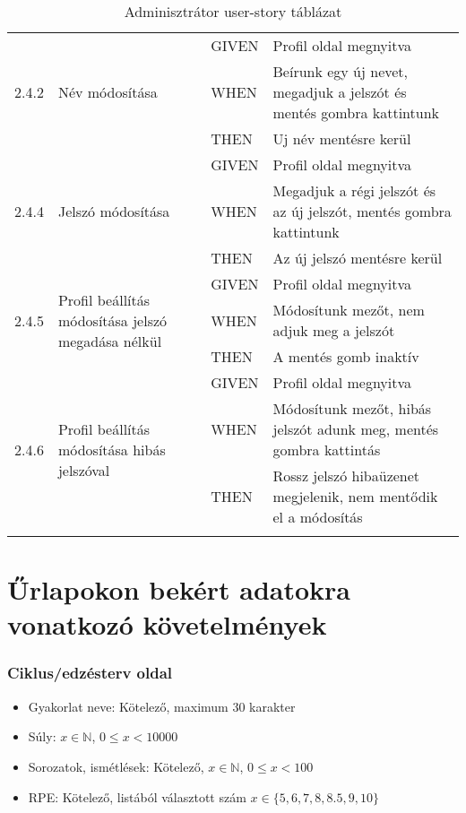 \begin{center}
\begin{longtable}{ | p{} | p{} | p{} | p{} | }
			\multirow{3}{*}{2.4.2} 
			& \multirow{3}{=}{Név módosítása} 
			& GIVEN 
			& Profil oldal megnyitva \\
			\cline{3-4}
			& & WHEN 
			& Beírunk egy új nevet, megadjuk a jelszót és mentés gombra kattintunk \\
			\cline{3-4}
			& & THEN 
			& Uj név mentésre kerül \\
			\hline

			\multirow{3}{*}{2.4.4} 
			& \multirow{3}{=}{Jelszó módosítása} 
			& GIVEN 
			& Profil oldal megnyitva \\
			\cline{3-4}
			& & WHEN 
			& Megadjuk a régi jelszót és az új jelszót, mentés gombra kattintunk \\
			\cline{3-4}
			& & THEN 
			& Az új jelszó mentésre kerül \\
			\hline

			\multirow{3}{*}{2.4.5} 
			& \multirow{3}{=}{Profil beállítás módosítása jelszó megadása nélkül} 
			& GIVEN 
			& Profil oldal megnyitva \\
			\cline{3-4}
			& & WHEN 
			& Módosítunk mezőt, nem adjuk meg a jelszót \\
			\cline{3-4}
			& & THEN 
			& A mentés gomb inaktív \\
			\hline

			\multirow{3}{*}{2.4.6} 
			& \multirow{3}{=}{Profil beállítás módosítása hibás jelszóval} 
			& GIVEN 
			& Profil oldal megnyitva \\
			\cline{3-4}
			& & WHEN 
			& Módosítunk mezőt, hibás jelszót adunk meg, mentés gombra kattintás \\
			\cline{3-4}
			& & THEN 
			& Rossz jelszó hibaüzenet megjelenik, nem mentődik el a módosítás \\
			\hline

			\caption{Adminisztrátor user-story táblázat}
			\label{tab:userstoryadmin}       
	\end{longtable}
\end{center}

\section{Űrlapokon bekért adatokra vonatkozó követelmények}

\subsubsection{Ciklus/edzésterv oldal}

\begin{itemize}
	\item Gyakorlat neve: Kötelező, maximum 30 karakter
	\item Súly: $x \in \mathbb{N}$, $0 \leq x < 10000$
	\item Sorozatok, ismétlések: Kötelező, $x \in \mathbb{N}$, $0 \leq x < 100$
	\item RPE: Kötelező, listából választott szám $x \in \{5, 6, 7, 8, 8.5, 9, 10\}$
\end{itemize}

